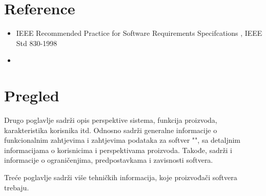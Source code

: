 \section{Reference}

\begin{itemize}
\item IEEE Recommended Practice for Software Requirements Specifcations , IEEE Std 830-1998
\item 
\end{itemize}
\section{Pregled}

Drugo poglavlje sadrži opis perspektive sistema, funkcija proizvoda, karakteristika korisnika itd.
Odnosno sadrži generalne informacije o funkcionalnim zahtjevima i zahtjevima podataka za softver "\naziv", sa detaljnim informacijama o korisnicima i perspektivama proizvoda. Takođe, sadrži i informacije o ograničenjima, predpostavkama i zavisnosti softvera.

Treće poglavlje sadrži više tehničkih informacija, koje proizvođači softvera trebaju.